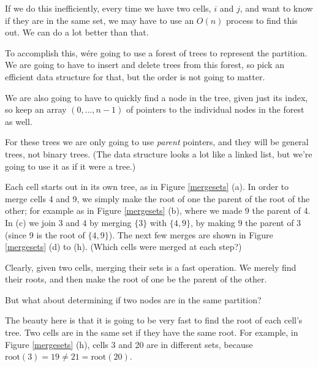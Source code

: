\documentclass{article}
\newcommand{\set}[1]{\ensuremath{\{#1\}}}
\begin{document}
\begin{description}
If we do this inefficiently, every time we have two cells, $i$ and
$j$, and want to know if they are in the same set, we may have to use
an $O(n)$ process to find this out.  We can do a lot better than that.

  To accomplish this, wére going to use a forest of trees to represent
  the partition.  We are going to have to insert and delete trees from
  this forest, so pick an efficient data structure for that, but the
  order is not going to matter.

  We are also going to have to quickly find a node in the tree, given
  just its index, so keep an array $(0,\ldots,n-1)$ of pointers to the
  individual nodes in the forest as well.

For these trees we are only going to use {\em parent} pointers, and
they will be general trees, not binary trees.  (The data structure
looks a lot like a linked list, but we're going to use it as if it
were a tree.)

  Each cell starts out in its own tree, as in Figure \ref{mergesets}
  (a).  In order to merge cells 4 and 9, we simply make the root of
  one the parent of the root of the other; for example as in Figure
  \ref{mergesets} (b), where we made 9 the parent of 4.  In (c) we
  join 3 and 4 by merging \set{3} with \set{4,9}, by making 9 the
  parent of 3 (since 9 is the root of \set{4,9}).  The next few merges
  are shown in Figure \ref{mergesets} (d) to (h).  (Which cells were
  merged at each step?)

Clearly, given two cells, merging their sets is a fast operation.  We
merely find their roots, and then make the root of one be the parent
of the other.

But what about determining if two nodes are in the same partition?

The beauty here is that it is going to be very fast to find the root
of each cell's tree.  Two cells are in the same set if they have the
same root.  For example, in Figure \ref{mergesets} (h), cells 3 and 20
are in different sets, because $\mbox{root}(3) = 19 \not =
21 = \mbox{root}(20) $.




\end{description}
\end{document}
